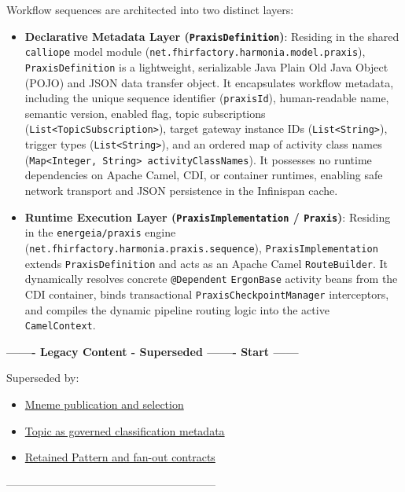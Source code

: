 Workflow sequences are architected into two distinct layers:
\begin{itemize}
    \item \textbf{Declarative Metadata Layer (\texttt{PraxisDefinition})}: Residing in the shared \texttt{calliope} model module (\texttt{net.fhirfactory.harmonia.model.praxis}), \texttt{PraxisDefinition} is a lightweight, serializable Java Plain Old Java Object (POJO) and JSON data transfer object. It encapsulates workflow metadata, including the unique sequence identifier (\texttt{praxisId}), human-readable name, semantic version, enabled flag, topic subscriptions (\texttt{List<TopicSubscription>}), target gateway instance IDs (\texttt{List<String>}), trigger types (\texttt{List<String>}), and an ordered map of activity class names (\texttt{Map<Integer, String> activityClassNames}). It possesses no runtime dependencies on Apache Camel, CDI, or container runtimes, enabling safe network transport and JSON persistence in the Infinispan cache.
    \item \textbf{Runtime Execution Layer (\texttt{PraxisImplementation} / \texttt{Praxis})}: Residing in the \texttt{energeia/praxis} engine (\texttt{net.fhirfactory.harmonia.praxis.sequence}), \texttt{PraxisImplementation} extends \texttt{PraxisDefinition} and acts as an Apache Camel \texttt{RouteBuilder}. It dynamically resolves concrete \texttt{@Dependent} \texttt{ErgonBase} activity beans from the CDI container, binds transactional \texttt{PraxisCheckpointManager} interceptors, and compiles the dynamic pipeline routing logic into the active \texttt{CamelContext}.
\end{itemize}

\par\noindent\textbf{------- Legacy Content - Superseded ------- Start ------}
\par\noindent Superseded by:
\begin{itemize}
  \item \href{../../markdown/05-information-systems-architecture/pathways-journeys-and-handoff.md\#publication-and-selection}{Mneme publication and selection}
  \item \href{../../markdown/05-information-systems-architecture/pathways-journeys-and-handoff.md\#pragma-and-topic}{Topic as governed classification metadata}
  \item \href{../../markdown/05-information-systems-architecture/gaps.md}{Retained Pattern and fan-out contracts}
\end{itemize}
\noindent ---------------------------------------------------------

